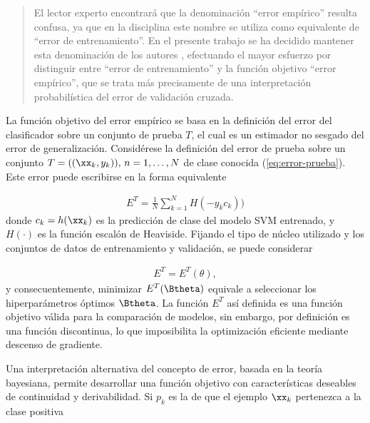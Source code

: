 \begin{quote}
  El lector experto encontrará que la denominación ``error empírico''
  resulta confusa, ya que en la disciplina este nombre se utiliza como
  equivalente de ``error de entrenamiento''. En el presente trabajo se
  ha decidido mantener esta denominación de los autores \cite{ayat},
  efectuando el mayor esfuerzo por distinguir entre ``error de
  entrenamiento'' y la función objetivo ``error empírico'', que se
  trata más precisamente de una interpretación probabilística del
  error de validación cruzada.
\end{quote}
La función objetivo del error empírico se basa en la definición del
error del clasificador sobre un conjunto de prueba $T$, el cual es
un estimador
no sesgado del error de generalización.  Considérese la definición del
error de prueba sobre un conjunto $T=((\xx_k,y_k)),\,n=1,\ldots,N$ de
clase conocida (\autoref{eq:error-prueba}).  Este error puede
escribirse en la forma equivalente

\begin{align*}
\label{E^V}
  E^T = \frac{1}{N}\sum_{k=1}^{N} H(-{y}_k {c}_k))
\end{align*}
donde $c_k=h(\xx_k)$ es la predicción de clase del modelo SVM
entrenado, y $H(\cdot)$ es la función escalón de Heaviside.  Fijando
el tipo de núcleo utilizado y los conjuntos de datos de entrenamiento
y validación, se puede considerar

\begin{align*}
  E^T = E^T(\theta),
\end{align*}
y consecuentemente, minimizar $E^T(\Btheta)$ equivale a seleccionar
los hiperparámetros óptimos $\Btheta$. La función $E^T$ así definida
es una función objetivo válida para la comparación de modelos, sin
embargo, por definición es una función discontinua, lo que
imposibilita la optimización eficiente mediante descenso de gradiente.

Una interpretación alternativa del concepto de error, basada en la
teoría bayesiana, permite desarrollar una función objetivo con
características deseables de continuidad y derivabilidad.  Si $p_k$ es
la  de que el ejemplo $\xx_k$ pertenezca
a la clase positiva

